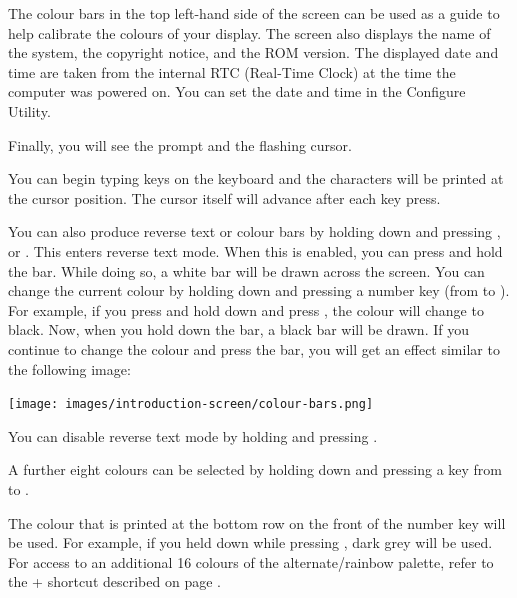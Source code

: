 The colour bars in the top left-hand side of the screen can be used as a guide to help calibrate the colours of your display. The screen also displays the name of the system, the copyright notice, and the ROM version. The displayed date and time are taken from the internal RTC (Real-Time Clock) at the time the computer was powered on. You can set the date and time in the Configure Utility.

Finally, you will see the  prompt and the flashing cursor.

You can begin typing keys on the keyboard and the characters will be printed at the cursor position. The cursor itself will advance after each key press.

You can also produce reverse text or colour bars by holding down  and pressing , or . This enters reverse text mode. When this is enabled, you can press and hold the  bar. While doing so, a white bar will be drawn across the screen.
You can change the current colour by holding  down and pressing a number key (from 
to ). For example, if you press and hold  down and press , the colour will
change to black. Now, when you hold down the  bar, a black bar will be drawn. If you continue to
change the colour and press the  bar, you will get an effect similar to the following image:

\begin{center}
\texttt{[image: images/introduction-screen/colour-bars.png]}
\end{center}

You can disable reverse text mode by holding  and pressing .

A further eight colours can be selected by holding down \megasymbolkey and pressing a key from  to .

The colour that is printed at the bottom row on the front of the number key will be used. For example, if you held
\megasymbolkey down while pressing , dark grey will be used. For access to an additional 16 colours of the alternate/rainbow palette, refer to the  +  shortcut described on page \pageref{appendix:controlcodes}.

